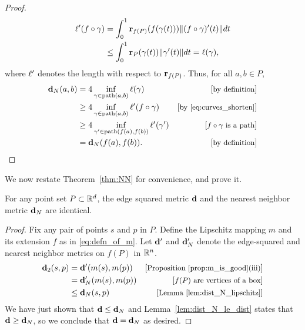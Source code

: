 \begin{proof}
    \begin{align}
      \ell'(f\circ \gamma) &= \int_0^1 \mathbf{r}_{f(P)}(f(\gamma(t)))\|(f\circ\gamma)'(t)\|dt \nonumber\\
              & \le \int_0^1 \mathbf{r}_{P}(\gamma(t))\|\gamma'(t)\|dt = \ell(\gamma),\label{eq:curves_shorten}
      \end{align}
    where $\ell'$ denotes the length with respect to $\mathbf{r}_{f(P)}$.
    Thus, for all $a,b\in P$,
    \begin{align*}
      \mathbf{d}_N(a,b)
        &= 4 \inf_{\gamma\in \mathrm{path}(a,b)} \ell(\gamma) &\left[\text{\small{by definition}}\right]\\
        &\ge 4 \inf_{\gamma\in \mathrm{path}(a,b)} \ell'(f\circ\gamma) &\left[\text{\small{by \eqref{eq:curves_shorten}}}\right]\\
        &\ge 4 \inf_{\gamma'\in \mathrm{path}(f(a),f(b))} \ell'(\gamma') &\left[\text{\small{$f\circ\gamma$ is a path}}\right]\\
        &= \mathbf{d}_N(f(a), f(b)). &\left[\text{\small{by definition}}\right]\\
    \end{align*}
  \end{proof}

  We now restate Theorem~\ref{thm:NN} for convenience, and prove
  it.
  \begin{theorem}\label{thm:equality}
    For any point set $P\subset{\mathbb R}^d$, the edge squared metric $\mathbf{d}$ and the nearest neighbor metric $\mathbf{d}_N$ are identical.
  \end{theorem}
  \begin{proof}
    Fix any pair of points $s$ and $p$ in $P$.
    Define the Lipschitz mapping $m$ and its extension $f$ as in \eqref{eq:defn_of_m}.
    Let $\mathbf{d}'$ and $\mathbf{d}_N'$ denote the edge-squared and nearest neighbor metrics on $f(P)$ in ${\mathbb R}^n$.
    \begin{align*}
      \mathbf{d}_2(s,p)
        &= \mathbf{d}'(m(s), m(p)) &\left[\text{\small{Proposition~\ref{prop:m_is_good}(iii)}}\right]\\
        &= \mathbf{d}_N'(m(s), m(p)) &\left[\text{\small{$f(P)$ are vertices of a box}}\right]\\
        &\le \mathbf{d}_N(s, p) &\left[\text{\small{Lemma~\ref{lem:dist_N_lipschitz}}}\right]
    \end{align*}
    We have just shown that $\mathbf{d}\le \mathbf{d}_N$ and Lemma~\ref{lem:dist_N_le_dist} states that $\mathbf{d}\ge \mathbf{d}_N$, so we conclude that $\mathbf{d} = \mathbf{d}_N$ as desired.
  \end{proof}

